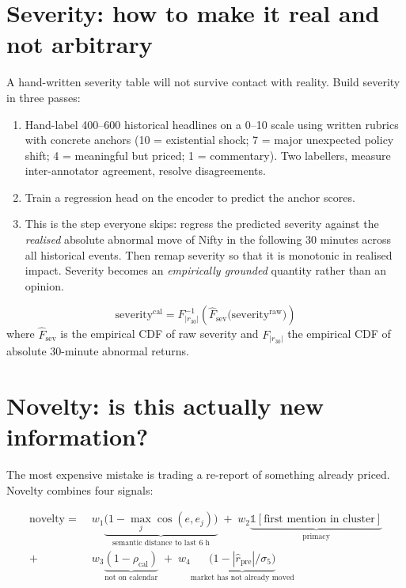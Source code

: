 \section{Severity: how to make it real and not arbitrary}
\label{sec:severity}

A hand-written severity table will not survive contact with reality. Build
severity in three passes:

\begin{enumerate}
\item {} Hand-label 400--600 historical headlines on a 0--10
scale using written rubrics with concrete anchors (10 = existential shock;
7 = major unexpected policy shift; 4 = meaningful but priced; 1 = commentary).
Two labellers, measure inter-annotator agreement, resolve disagreements.
\item {} Train a regression head on the encoder to predict
the anchor scores.
\item {} This is the step everyone skips: regress
the predicted severity against the \emph{realised} absolute abnormal move of
Nifty in the following 30 minutes across all historical events. Then remap
severity so that it is monotonic in realised impact. Severity becomes an
\emph{empirically grounded} quantity rather than an opinion.
\end{enumerate}

\[
\text{severity}^{\text{cal}} = F^{-1}_{|r_{30}|}\!\left(
\hat{F}_{\text{sev}}\big(\text{severity}^{\text{raw}}\big)\right)
\]
where $\hat F_{\text{sev}}$ is the empirical CDF of raw severity and
$F_{|r_{30}|}$ the empirical CDF of absolute 30-minute abnormal returns.

\section{Novelty: is this actually new information?}
\label{sec:novelty}

The most expensive mistake is trading a re-report of something already priced.
Novelty combines four signals:

\begin{align*}
\text{novelty} \;=\;\;& w_1 \underbrace{\big(1-\max_j \cos(e, e_j)\big)}_{\text{semantic distance to last 6 h}}
\;+\; w_2 \underbrace{\mathbb{1}[\text{first mention in cluster}]}_{\text{primacy}} \\[5pt]
+\;& w_3 \underbrace{(1 - \rho_{\text{cal}})}_{\text{not on calendar}}
\;+\; w_4 \underbrace{\big(1 - |\hat r_{\text{pre}}| / \sigma_{5}\big)}_{\text{market has not already moved}}
\end{align*}

